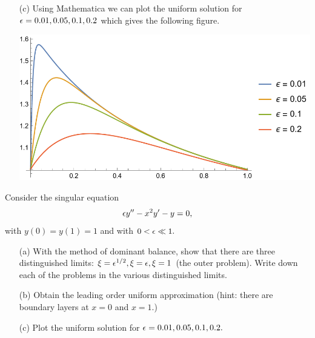 \documentclass[12pt]{report}
\begin{document}
\begin{solution}
\begin{enumerate}
        \item [(c)]
        Using Mathematica we can plot the uniform solution for ${\epsilon} = 0.01,0.05,0.1,0.2$ which gives the following figure.
        \begin{center}
            \includegraphics[width=.8\textwidth]{p1.png}
        \end{center}
    
    
    
    \end{enumerate}
\end{solution}

\newpage



\begin{problem}
    Consider the singular equation
    \[
        {\epsilon} y'' - x^2y' - y = 0,   
    \]
    with $y(0) = y(1) = 1$ and with $0 < {\epsilon} \ll 1.$
    \begin{enumerate}
        \item [(a)] With the method of dominant balance, show that there are three distinguished limits: $\xi = {\epsilon}^{1/2}, \xi = {\epsilon}, \xi = 1$ (the outer problem). Write down each of the problems in the various distinguished limits.
        \item [(b)] Obtain the leading order uniform approximation (hint: there are boundary layers at $x=0$ and $x=1$.)
        \item [(c)] Plot the uniform solution for ${\epsilon} = 0.01,0.05,0.1,0.2.$
    \end{enumerate}
\end{problem}
\end{document}
